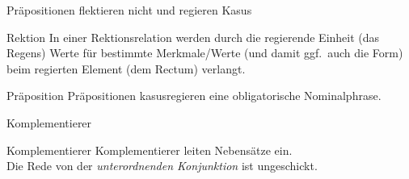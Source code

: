 \begin{frame}
  {Präpositionen flektieren nicht und regieren Kasus}
  \pause
  \begin{exe}
    \ex
    \begin{xlist}
      \pause
      \pause
      \pause
    \end{xlist}
  \end{exe}
  \pause
  \pause
  \pause
  \Zeile
  \begin{block}{Rektion}
    In einer Rektionsrelation werden durch die regierende Einheit (das \alert{Regens}) Werte für bestimmte Merkmale\slash Werte (und damit ggf.\ auch die Form) beim regierten Element (dem \alert{Rectum}) verlangt.\\
  \end{block}
  \Zeile
  \pause
  \begin{block}{Präposition}
    Präpositionen kasusregieren eine obligatorische Nominalphrase.
  \end{block}
\end{frame}

\begin{frame}
  {Komplementierer}
  \pause
  \begin{exe}
    \ex
    \begin{xlist}
    \end{xlist}
  \end{exe}
  \Zeile
  \begin{block}{Komplementierer}
    Komplementierer leiten Nebensätze ein.\\
    Die Rede von der \textit{unterordnenden Konjunktion} ist ungeschickt.
  \end{block}
\end{frame}

